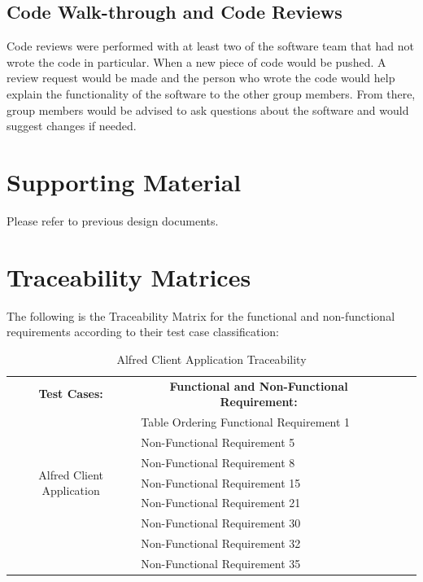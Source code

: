 \documentclass [10pt]{article}
\begin{document}
\subsection {Code Walk-through and Code Reviews}
Code reviews were performed with at least two of the software team that had not wrote the code in particular. When a new piece of code would be pushed. A review request would be made and the person who wrote the code would help explain the functionality of the software to the other group members. From there, group members would be advised to ask questions about the software and would suggest changes if needed.


\section {Supporting Material}

Please refer to previous design documents.

\section {Traceability Matrices}
The following is the Traceability Matrix for the functional and non-functional requirements according to their test case classification: \\


\begin{table}[h!]
\centering
\begin{tabular}{lllll}
\cline{1-2}
\multicolumn{1}{|c|}{\textbf{Test Cases:}} & \multicolumn{1}{c|}{\textbf{Functional and Non-Functional Requirement:}} &  &  &  \\ \cline{1-2}
\multicolumn{1}{|c|}{\multirow{7}{*}{Alfred Client Application}} & \multicolumn{1}{l|}{Table Ordering Functional Requirement 1} &  &  &  \\ \cline{2-2}
\multicolumn{1}{|c|}{} & \multicolumn{1}{l|}{Non-Functional Requirement 5} &  &  &  \\ \cline{2-2}
\multicolumn{1}{|c|}{} & \multicolumn{1}{l|}{Non-Functional Requirement 8} &  &  &  \\ \cline{2-2}
\multicolumn{1}{|c|}{} & \multicolumn{1}{l|}{Non-Functional Requirement 15} &  &  &  \\ \cline{2-2}
\multicolumn{1}{|c|}{} & \multicolumn{1}{l|}{Non-Functional Requirement 21} &  &  &  \\ \cline{2-2}
\multicolumn{1}{|c|}{} & \multicolumn{1}{l|}{Non-Functional Requirement 30} &  &  &  \\ \cline{2-2}
\multicolumn{1}{|c|}{} & \multicolumn{1}{l|}{Non-Functional Requirement 32} &  &  &  \\ \cline{2-2}
\multicolumn{1}{|c|}{} & \multicolumn{1}{l|}{Non-Functional Requirement 35} &  &  &  \\ \cline{1-2}
\end{tabular}
\caption{Alfred Client Application Traceability}
\end{table}
\end{document}
